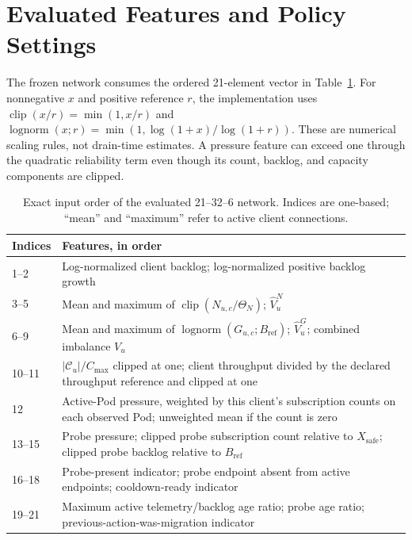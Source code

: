 \section{Evaluated Features and Policy Settings}
\label{app:feature-order}

The frozen network consumes the ordered 21-element vector in
Table~\ref{tab:feature-order}. For nonnegative $x$ and positive reference $r$,
the implementation uses $\operatorname{clip}(x/r)=\min(1,x/r)$ and
$\operatorname{lognorm}(x;r)=\min(1,\log(1+x)/\log(1+r))$.
These are numerical scaling rules, not drain-time estimates. A pressure
feature can exceed one through the quadratic reliability term even though
its count, backlog, and capacity components are clipped.

\begin{table}[!htbp]
\centering\small
\caption{Exact input order of the evaluated 21--32--6 network. Indices are
one-based; ``mean'' and ``maximum'' refer to active client connections.}
\label{tab:feature-order}
\begin{tabular}{p{}p{}}
\toprule
Indices & Features, in order\\
\midrule
1--2 & Log-normalized client backlog; log-normalized positive backlog growth\\
3--5 & Mean and maximum of $\operatorname{clip}(N_{u,c}/\Theta_N)$; $\widehat V_u^N$\\
6--9 & Mean and maximum of $\operatorname{lognorm}(G_{u,c};B_{\mathrm{ref}})$; $\widehat V_u^G$; combined imbalance $V_u$\\
10--11 & $|\mathcal C_u|/C_{\max}$ clipped at one; client throughput divided by the declared throughput reference and clipped at one\\
12 & Active-Pod pressure, weighted by this client's subscription counts on each observed Pod; unweighted mean if the count is zero\\
13--15 & Probe pressure; clipped probe subscription count relative to $X_{\mathrm{safe}}$; clipped probe backlog relative to $B_{\mathrm{ref}}$\\
16--18 & Probe-present indicator; probe endpoint absent from active endpoints; cooldown-ready indicator\\
19--21 & Maximum active telemetry/backlog age ratio; probe age ratio; previous-action-was-migration indicator\\
\bottomrule
\end{tabular}
\end{table}

